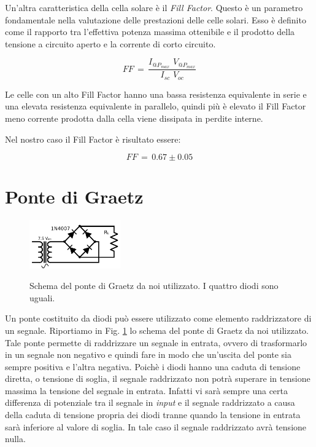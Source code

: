 Un'altra caratteristica della cella solare è il \emph{Fill Factor}. Questo è un parametro fondamentale nella valutazione delle prestazioni delle celle solari. Esso è definito come il rapporto tra l'effettiva potenza massima ottenibile e il prodotto della tensione a circuito aperto e la corrente di corto circuito.

\begin{equation}
FF \, = \, \frac{I_{@P_{max}} \,\, V_{@P_{max}}}{I_{sc} \,\, V_{oc}}
\label{eq:FF}
\end{equation}

Le celle con un alto Fill Factor hanno una bassa resistenza equivalente in serie e una elevata resistenza equivalente in parallelo, quindi più è elevato il Fill Factor meno corrente prodotta dalla cella viene dissipata in perdite interne.

Nel nostro caso il Fill Factor è risultato essere:

$$FF \,=\, 0.67 \pm 0.05$$
\section{Ponte di Graetz}

\begin{figure}
	\caption{Schema del ponte di Graetz da noi utilizzato. I quattro diodi sono uguali.}
	\includegraphics[width=0.35\textwidth]{schema_graetz.pdf}
	\label{fig:graetz}
\end{figure}

Un ponte costituito da diodi può essere utilizzato come elemento raddrizzatore di un segnale. Riportiamo in Fig. \ref{fig:graetz} lo schema del ponte di Graetz da noi utilizzato. Tale ponte permette di raddrizzare un segnale in entrata, ovvero di trasformarlo in un segnale non negativo e quindi fare in modo che un'uscita del ponte sia sempre positiva e l'altra negativa. Poichè i diodi hanno una caduta di tensione diretta, o tensione di soglia, il segnale raddrizzato non potrà superare in tensione massima la tensione del segnale in entrata. Infatti vi sarà sempre una certa differenza di potenziale tra il segnale in \emph{input} e il segnale raddrizzato a causa della caduta di tensione propria dei diodi tranne quando la tensione in entrata sarà inferiore al valore di soglia. In tale caso il segnale raddrizzato avrà tensione nulla.

